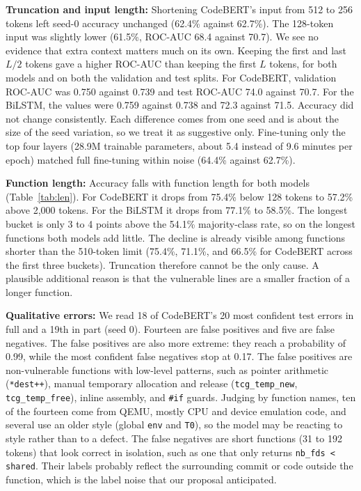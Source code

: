 \documentclass{article}
\begin{document}
\textbf{Truncation and input length:}
Shortening CodeBERT's input from 512 to 256 tokens left seed-0 accuracy unchanged (62.4\% against 62.7\%). The 128-token input was slightly lower (61.5\%, ROC-AUC 68.4 against 70.7). We see no evidence that extra context matters much on its own.
Keeping the first and last $L/2$ tokens gave a higher ROC-AUC than keeping the first $L$ tokens, for both models and on both the validation and test splits. For CodeBERT, validation ROC-AUC was 0.750 against 0.739 and test ROC-AUC 74.0 against 70.7. For the BiLSTM, the values were 0.759 against 0.738 and 72.3 against 71.5. Accuracy did not change consistently. Each difference comes from one seed and is about the size of the seed variation, so we treat it as suggestive only.
Fine-tuning only the top four layers (28.9M trainable parameters, about 5.4 instead of 9.6 minutes per epoch) matched full fine-tuning within noise (64.4\% against 62.7\%).

\textbf{Function length:}
Accuracy falls with function length for both models (Table~\ref{tab:len}). For CodeBERT it drops from 75.4\% below 128 tokens to 57.2\% above 2{,}000 tokens. For the BiLSTM it drops from 77.1\% to 58.5\%. The longest bucket is only 3 to 4 points above the 54.1\% majority-class rate, so on the longest functions both models add little.
The decline is already visible among functions shorter than the 510-token limit (75.4\%, 71.1\%, and 66.5\% for CodeBERT across the first three buckets). Truncation therefore cannot be the only cause. A plausible additional reason is that the vulnerable lines are a smaller fraction of a longer function.

\textbf{Qualitative errors:}
We read 18 of CodeBERT's 20 most confident test errors in full and a 19th in part (seed 0). Fourteen are false positives and five are false negatives. The false positives are also more extreme: they reach a probability of 0.99, while the most confident false negatives stop at 0.17.
The false positives are non-vulnerable functions with low-level patterns, such as pointer arithmetic (\texttt{*dest++}), manual temporary allocation and release (\texttt{tcg\_temp\_new}, \texttt{tcg\_temp\_free}), inline assembly, and \texttt{\#if} guards. Judging by function names, ten of the fourteen come from QEMU, mostly CPU and device emulation code, and several use an older style (global \texttt{env} and \texttt{T0}), so the model may be reacting to style rather than to a defect.
The false negatives are short functions (31 to 192 tokens) that look correct in isolation, such as one that only returns \texttt{nb\_fds < shared}. Their labels probably reflect the surrounding commit or code outside the function, which is the label noise that our proposal anticipated.
\end{document}
